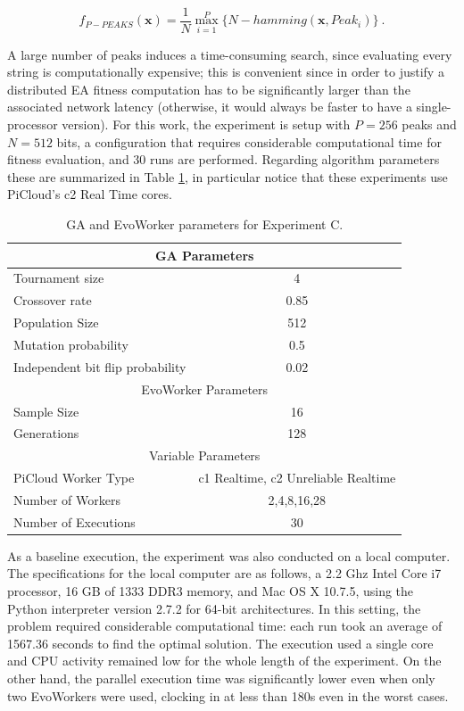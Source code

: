 \begin{equation}
f_{P-PEAKS}(\mathbf{x})=\frac{1}{N} \overset{P}{\max_{i=1}} \{N-hamming(\mathbf{x},Peak_i)   \} \ .
\end{equation}

A large number of peaks induces a time-consuming search,
since evaluating every string is computationally expensive; this is
convenient since in order to justify a distributed EA fitness computation has to be significantly larger than the associated
network latency (otherwise, it would always be faster to have a single-processor version).
For this work, the experiment is setup with $P = 256$ peaks and $N = 512$ bits, a configuration that requires considerable computational time for
fitness evaluation, and 30 runs are performed.
Regarding algorithm parameters these are summarized in Table \ref{tab:paramse},
in particular notice that these experiments use PiCloud's c2 Real Time cores.

\begin{table}[t]
\renewcommand{\arraystretch}{1.3}
\caption{GA and EvoWorker parameters for Experiment C.}
\label{tab:paramse}
\centering
\begin{tabular}{|l||c|}
\hline
\multicolumn{2}{|c|}{GA Parameters} \\
\hline
Tournament size & 4 \\
Crossover rate & 0.85  \\
Population Size & 512 \\
Mutation probability & 0.5 \\
Independent bit flip probability  & 0.02 \\
\hline
\multicolumn{2}{|c|}{EvoWorker Parameters} \\
\hline
Sample Size & 16 \\
Generations & 128 \\
\hline
\multicolumn{2}{|c|}{Variable Parameters} \\
\hline
PiCloud Worker Type & c1 Realtime, c2 Unreliable Realtime \\
Number of Workers & 2,4,8,16,28 \\
Number of Executions & 30 \\
\hline

\end{tabular}
\end{table}

As a baseline execution, the experiment was also conducted on a local computer. The specifications for the local computer are as follows, a
2.2 Ghz Intel Core i7 processor, 16 GB of 1333 DDR3 memory, and Mac OS X 10.7.5,
using the Python interpreter version 2.7.2 for 64-bit architectures. 
In this setting, the problem required considerable computational time: each run took an average of 1567.36 seconds to find the optimal solution.
The execution used a single core and CPU activity remained low for the whole length of the experiment. On the other hand,
the parallel execution time was significantly lower even when only two EvoWorkers were used, clocking in at less than 180s even in the worst cases.

